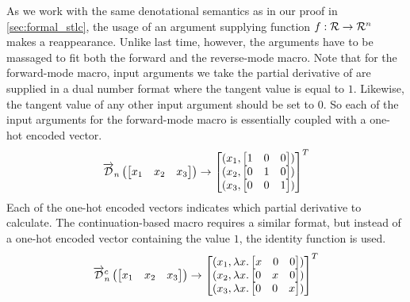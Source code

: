   As we work with the same denotational semantics as in our proof in \cref{sec:formal_stlc}, the usage of an argument supplying function $f : \mathcal{R} \rightarrow \mathcal{R}^n$ makes a reappearance.
  Unlike last time, however, the arguments have to be massaged to fit both the forward and the reverse-mode macro.
  Note that for the forward-mode macro, input arguments we take the partial derivative of are supplied in a dual number format where the tangent value is equal to $1$.
  Likewise, the tangent value of any other input argument should be set to $0$.
  So each of the input arguments for the forward-mode macro is essentially coupled with a one-hot encoded vector.
  \begin{equation*}
    \overrightarrow{\mathcal{D}}_n\left(
    \begin{bmatrix}
      x_1 & x_2 & x_3 \\
    \end{bmatrix}\right)
    \to
    \begin{bmatrix}
      (x_1,
        \begin{bmatrix}
          1 & 0 & 0 \\
        \end{bmatrix}) \\
      (x_2,
        \begin{bmatrix}
          0 & 1 & 0 \\
        \end{bmatrix}) \\
      (x_3,
        \begin{bmatrix}
          0 & 0 & 1 \\
        \end{bmatrix}) \\
    \end{bmatrix}^T
  \end{equation*}
  Each of the one-hot encoded vectors indicates which partial derivative to calculate.
  The continuation-based macro requires a similar format, but instead of a one-hot encoded vector containing the value $1$, the identity function is used.
  \begin{equation*}
    \overrightarrow{\mathcal{D}}^c_n\left(
    \begin{bmatrix}
      x_1 & x_2 & x_3 \\
    \end{bmatrix}\right)
    \to
    \begin{bmatrix}
      (x_1,
        \lambda x.
        \begin{bmatrix}
          x & 0 & 0 \\
        \end{bmatrix}) \\
      (x_2,
        \lambda x.
        \begin{bmatrix}
          0 & x & 0 \\
        \end{bmatrix}) \\
      (x_3,
        \lambda x.
        \begin{bmatrix}
          0 & 0 & x \\
        \end{bmatrix}) \\
    \end{bmatrix}^T
  \end{equation*}


